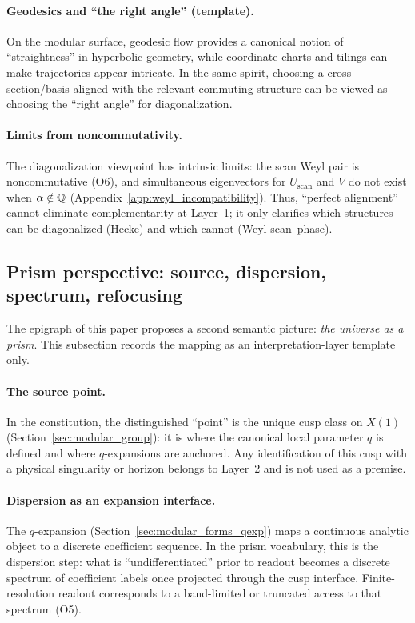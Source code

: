 \paragraph{Geodesics and ``the right angle'' (template).}
On the modular surface, geodesic flow provides a canonical notion of ``straightness'' in hyperbolic geometry, while coordinate charts and tilings can make trajectories appear intricate. In the same spirit, choosing a cross-section/basis aligned with the relevant commuting structure can be viewed as choosing the ``right angle'' for diagonalization.

\paragraph{Limits from noncommutativity.}
The diagonalization viewpoint has intrinsic limits: the scan Weyl pair is noncommutative (O6), and simultaneous eigenvectors for $U_{\mathrm{scan}}$ and $V$ do not exist when $\alpha\notin\mathbb{Q}$ (Appendix~\ref{app:weyl_incompatibility}). Thus, ``perfect alignment'' cannot eliminate complementarity at Layer~1; it only clarifies which structures can be diagonalized (Hecke) and which cannot (Weyl scan--phase).

\subsection{Prism perspective: source, dispersion, spectrum, refocusing}
\label{sec:prism_perspective}

The epigraph of this paper proposes a second semantic picture: \emph{the universe as a prism}. This subsection records the mapping as an interpretation-layer template only.

\paragraph{The source point.}
In the constitution, the distinguished ``point'' is the unique cusp class on $X(1)$ (Section~\ref{sec:modular_group}): it is where the canonical local parameter $q$ is defined and where $q$-expansions are anchored. Any identification of this cusp with a physical singularity or horizon belongs to Layer~2 and is not used as a premise.

\paragraph{Dispersion as an expansion interface.}
The $q$-expansion (Section~\ref{sec:modular_forms_qexp}) maps a continuous analytic object to a discrete coefficient sequence. In the prism vocabulary, this is the dispersion step: what is ``undifferentiated'' prior to readout becomes a discrete spectrum of coefficient labels once projected through the cusp interface. Finite-resolution readout corresponds to a band-limited or truncated access to that spectrum (O5).

